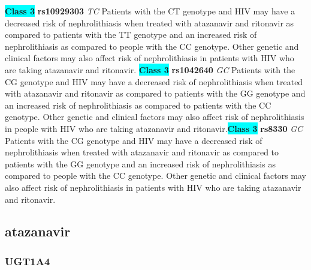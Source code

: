 \documentclass{book}
\begin{document}
\begin{center}
\textbf{\colorbox{cyan} {Class 3}} \textbf{ rs10929303 } \textit{ TC }
Patients with the CT genotype and HIV may have a decreased risk of nephrolithiasis when treated with atazanavir and ritonavir as compared to patients with the TT genotype and an increased risk of nephrolithiasis as compared to people with the CC genotype. Other genetic and clinical factors may also affect risk of nephrolithiasis in patients with HIV who are taking atazanavir and ritonavir. \textbf{\colorbox{cyan} {Class 3}} \textbf{ rs1042640 } \textit{ GC }
Patients with the CG genotype and HIV may have a decreased risk of nephrolithiasis when treated with atazanavir and ritonavir as compared to patients with the GG genotype and an increased risk of nephrolithiasis as compared to patients with the CC genotype. Other genetic and clinical factors may also affect risk of nephrolithiasis in people with HIV who are taking atazanavir and ritonavir.\textbf{\colorbox{cyan} {Class 3}} \textbf{ rs8330 } \textit{ GC }
Patients with the CG genotype and HIV may have a decreased risk of nephrolithiasis when treated with atazanavir and ritonavir as compared to patients with the GG genotype and an increased risk of nephrolithiasis as compared to people with the CC genotype. Other genetic and clinical factors may also affect risk of nephrolithiasis in patients with HIV who are taking atazanavir and ritonavir.


\end{center}\subsection{ atazanavir }


\subsubsection{ UGT1A4 }
\end{document}
